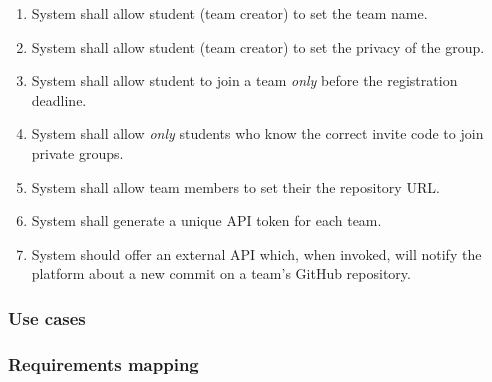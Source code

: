 \begin{enumerate}[label=$\bullet$ \textbf{R\arabic*:}]
    \item System shall allow student (team creator) to set the team name.
    \item System shall allow student (team creator) to set the privacy of the group.
    \item System shall allow student to join a team \textit{only} before the registration deadline.
    \item System shall allow \textit{only} students who know the correct invite code to join private groups.
    \item System shall allow team members to set their the repository URL.
    \item System shall generate a unique API token for each team.
    \item System should offer an external API which, when invoked, will notify the platform about a new commit on a team’s GitHub repository.
\end{enumerate}
\subsubsection{Use cases}
\subsubsection{Requirements mapping}

